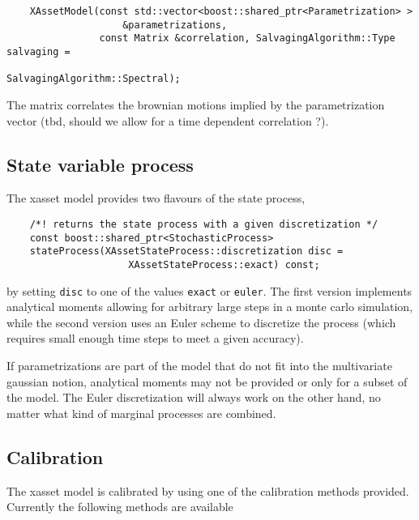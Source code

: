 \documentclass[12pt, a4paper]{article}
\begin{document}
\medskip
\scriptsize
\begin{verbatim}
    XAssetModel(const std::vector<boost::shared_ptr<Parametrization> >
                    &parametrizations,
                const Matrix &correlation, SalvagingAlgorithm::Type salvaging =
                                               SalvagingAlgorithm::Spectral);
\end{verbatim}
\normalsize
\medskip

The matrix correlates the brownian motions implied by the parametrization vector (tbd, should we allow for a time dependent correlation ?). 

\subsection{State variable process}

The xasset model provides two flavours of the state process,

\medskip
\scriptsize
\begin{verbatim}
    /*! returns the state process with a given discretization */
    const boost::shared_ptr<StochasticProcess>
    stateProcess(XAssetStateProcess::discretization disc =
                     XAssetStateProcess::exact) const;
\end{verbatim}
\normalsize
\medskip

by setting \verb+disc+ to one of the values \verb+exact+ or \verb+euler+. The first version implements analytical moments allowing for arbitrary large steps in a monte carlo simulation, while the second version uses an Euler scheme to discretize the process (which requires small enough time steps to meet a given accuracy).

If parametrizations are part of the model that do not fit into the multivariate gaussian notion, analytical moments may not be provided or only for a subset of the model. The Euler discretization will always work on the other hand, no matter what kind of marginal processes are combined.

\subsection{Calibration}

The xasset model is calibrated by using one of the calibration methods provided. Currently the following methods are available
\end{document}
